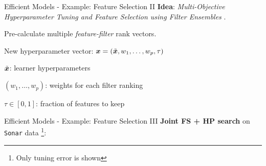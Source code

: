 \documentclass[11pt,compress,t,notes=noshow,xcolor=table]{beamer}
\begin{document}
\begin{framev}{Efficient Models - Example: Feature Selection II}
\textbf{Idea}: \emph{Multi-Objective Hyperparameter Tuning and Feature Selection using Filter Ensembles}
.\\
\spacer
\begin{itemizeM}
\item Pre-calculate multiple \emph{feature-filter} rank vectors.
\item New hyperparameter vector: $\bm{x} = (\tilde{\bm{x}}, w_1,\dots,w_p, \tau)$
\begin{itemizeM}
\item $\tilde{\bm{x}}$: learner hyperparameters
\item $(w_1,\dots,w_p)$: weights for each filter ranking
\item $\tau\in [0,1]$: fraction of features to keep
\end{itemizeM}
\end{itemizeM}
\end{framev}


\begin{framev}{Efficient Models - Example: Feature Selection III}
\textbf{Joint FS + HP search} on \texttt{Sonar} data
\footnote{Only tuning error is shown}:\\
\spacer
{}
\end{framev}
\end{document}
